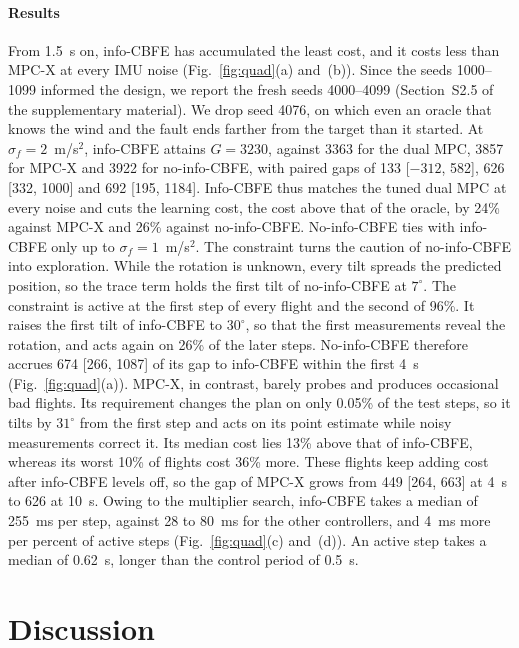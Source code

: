 \documentclass{l4dc2027}
\begin{document}
\paragraph{Results}
From 1.5~s on, info-CBFE has accumulated the least cost, and it costs less than MPC-X at every IMU noise (Fig.~\ref{fig:quad}(a) and~(b)). Since the seeds 1000--1099 informed the design, we report the fresh seeds 4000--4099 (Section~S2.5 of the supplementary material). We drop seed 4076, on which even an oracle that knows the wind and the fault ends farther from the target than it started. At $\sigma_f = 2$~m/s$^2$, info-CBFE attains $G = 3230$, against 3363 for the dual MPC, 3857 for MPC-X and 3922 for no-info-CBFE, with paired gaps of 133 [$-312$, 582], 626 [332, 1000] and 692 [195, 1184]. Info-CBFE thus matches the tuned dual MPC at every noise and cuts the learning cost, the cost above that of the oracle, by 24\% against MPC-X and 26\% against no-info-CBFE. No-info-CBFE ties with info-CBFE only up to $\sigma_f = 1$~m/s$^2$.
%
The constraint turns the caution of no-info-CBFE into exploration. While the rotation is unknown, every tilt spreads the predicted position, so the trace term holds the first tilt of no-info-CBFE at $7^\circ$. The constraint is active at the first step of every flight and the second of 96\%. It raises the first tilt of info-CBFE to $30^\circ$, so that the first measurements reveal the rotation, and acts again on 26\% of the later steps. No-info-CBFE therefore accrues 674 [266, 1087] of its gap to info-CBFE within the first 4~s (Fig.~\ref{fig:quad}(a)).
%
MPC-X, in contrast, barely probes and produces occasional bad flights. Its requirement changes the plan on only 0.05\% of the test steps, so it tilts by $31^\circ$ from the first step and acts on its point estimate while noisy measurements correct it. Its median cost lies 13\% above that of info-CBFE, whereas its worst 10\% of flights cost 36\% more. These flights keep adding cost after info-CBFE levels off, so the gap of MPC-X grows from 449 [264, 663] at 4~s to 626 at 10~s. Owing to the multiplier search, info-CBFE takes a median of 255~ms per step, against 28 to 80~ms for the other controllers, and 4~ms more per percent of active steps (Fig.~\ref{fig:quad}(c) and~(d)). An active step takes a median of 0.62~s, longer than the control period of 0.5~s.

\section{Discussion}\label{sec:discussion}
\end{document}
